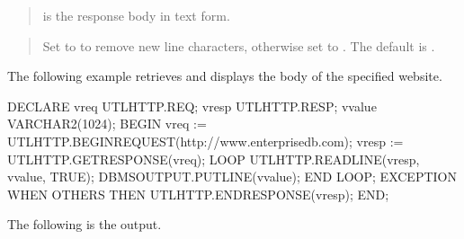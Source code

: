 \documentclass[letterpaper,10pt,english,openany,oneside]{sphinxmanual}
\begin{document}
\begin{quote}

 is the response body in text form.
\end{quote}

\begin{quote}

Set  to  to remove new line characters, otherwise
set to . The default is .
\end{quote}


The following example retrieves and displays the body of the specified
website.

%
\begin{sphinxVerbatim}[commandchars=\\\{\}]
DECLARE
    v\PYGZus{}req           UTL\PYGZus{}HTTP.REQ;
    v\PYGZus{}resp          UTL\PYGZus{}HTTP.RESP;
    v\PYGZus{}value         VARCHAR2(1024);
BEGIN
    v\PYGZus{}req := UTL\PYGZus{}HTTP.BEGIN\PYGZus{}REQUEST(\PYGZsq{}http://www.enterprisedb.com\PYGZsq{});
    v\PYGZus{}resp := UTL\PYGZus{}HTTP.GET\PYGZus{}RESPONSE(v\PYGZus{}req);
    LOOP
        UTL\PYGZus{}HTTP.READ\PYGZus{}LINE(v\PYGZus{}resp, v\PYGZus{}value, TRUE);
        DBMS\PYGZus{}OUTPUT.PUT\PYGZus{}LINE(v\PYGZus{}value);
    END LOOP;
    EXCEPTION
        WHEN OTHERS THEN
            UTL\PYGZus{}HTTP.END\PYGZus{}RESPONSE(v\PYGZus{}resp);
END;
\end{sphinxVerbatim}

The following is the output.
\end{document}
